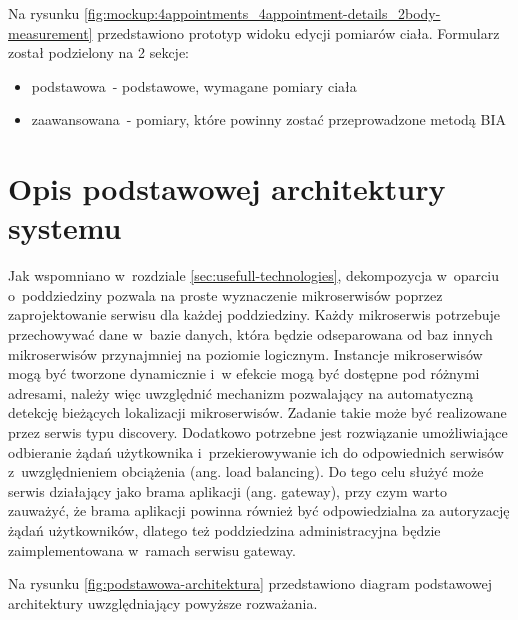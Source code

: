 


Na rysunku \ref{fig:mockup:4appointments_4appointment-details_2body-measurement} przedstawiono prototyp widoku edycji pomiarów ciała.
Formularz został podzielony na 2 sekcje:
\begin{itemize}
    \item podstawowa~- podstawowe, wymagane pomiary ciała
    \item zaawansowana~- pomiary, które powinny zostać przeprowadzone metodą BIA
\end{itemize}



\section{Opis podstawowej architektury systemu}\label{sec:basicArchitecture}

Jak wspomniano w~rozdziale \ref{sec:usefull-technologies}, dekompozycja w~oparciu o~poddziedziny
pozwala na proste wyznaczenie mikroserwisów poprzez zaprojektowanie serwisu dla każdej poddziedziny.
Każdy mikroserwis potrzebuje przechowywać dane w~bazie danych, która będzie odseparowana od baz innych mikroserwisów przynajmniej na poziomie logicznym.
Instancje mikroserwisów mogą być tworzone dynamicznie i~w efekcie mogą być dostępne pod różnymi adresami,
należy więc uwzględnić mechanizm pozwalający na automatyczną detekcję bieżących lokalizacji mikroserwisów.
Zadanie takie może być realizowane przez serwis typu discovery.
Dodatkowo potrzebne jest rozwiązanie umożliwiające odbieranie żądań użytkownika i~przekierowywanie ich do odpowiednich serwisów z~uwzględnieniem obciążenia (ang. load balancing).
Do tego celu służyć może serwis działający jako brama aplikacji (ang. gateway), przy czym warto zauważyć, że brama aplikacji powinna również być odpowiedzialna za autoryzację żądań użytkowników,
dlatego też poddziedzina administracyjna będzie zaimplementowana w~ramach serwisu gateway.
\par
Na rysunku \ref{fig:podstawowa-architektura} przedstawiono diagram podstawowej architektury uwzględniający powyższe rozważania.

